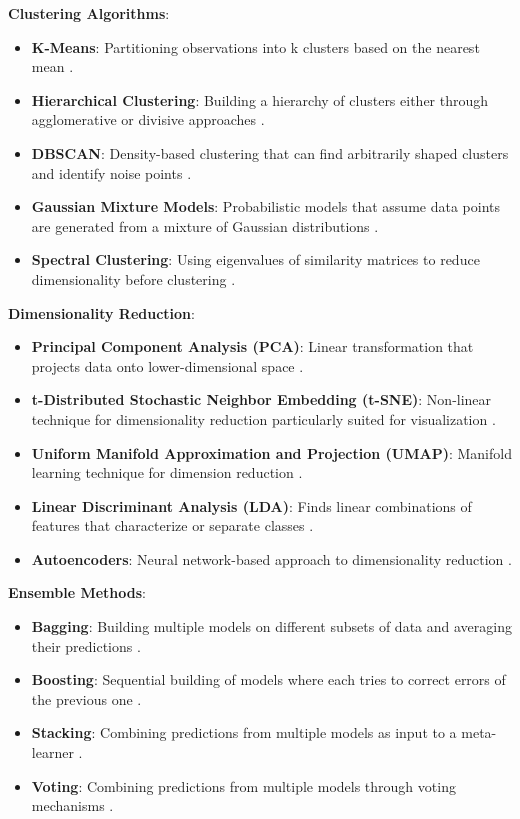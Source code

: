 \textbf{Clustering Algorithms}:
\begin{itemize}
  \item \textbf{K-Means}: Partitioning observations into k clusters based on the nearest mean \cite{macqueen1967some}.
  \item \textbf{Hierarchical Clustering}: Building a hierarchy of clusters either through agglomerative or divisive approaches \cite{johnson1967hierarchical}.
  \item \textbf{DBSCAN}: Density-based clustering that can find arbitrarily shaped clusters and identify noise points \cite{ester1996density}.
  \item \textbf{Gaussian Mixture Models}: Probabilistic models that assume data points are generated from a mixture of Gaussian distributions \cite{reynolds2009gaussian}.
  \item \textbf{Spectral Clustering}: Using eigenvalues of similarity matrices to reduce dimensionality before clustering \cite{ng2002spectral}.
\end{itemize}

\textbf{Dimensionality Reduction}:
\begin{itemize}
  \item \textbf{Principal Component Analysis (PCA)}: Linear transformation that projects data onto lower-dimensional space \cite{jolliffe2016principal}.
  \item \textbf{t-Distributed Stochastic Neighbor Embedding (t-SNE)}: Non-linear technique for dimensionality reduction particularly suited for visualization \cite{maaten2008visualizing}.
  \item \textbf{Uniform Manifold Approximation and Projection (UMAP)}: Manifold learning technique for dimension reduction \cite{mcinnes2018umap}.
  \item \textbf{Linear Discriminant Analysis (LDA)}: Finds linear combinations of features that characterize or separate classes \cite{fisher1936use}.
  \item \textbf{Autoencoders}: Neural network-based approach to dimensionality reduction \cite{hinton2006reducing}.
\end{itemize}

\textbf{Ensemble Methods}:
\begin{itemize}
  \item \textbf{Bagging}: Building multiple models on different subsets of data and averaging their predictions \cite{breiman1996bagging}.
  \item \textbf{Boosting}: Sequential building of models where each tries to correct errors of the previous one \cite{freund1997decision}.
  \item \textbf{Stacking}: Combining predictions from multiple models as input to a meta-learner \cite{wolpert1992stacked}.
  \item \textbf{Voting}: Combining predictions from multiple models through voting mechanisms \cite{dietterich2000ensemble}.
\end{itemize}

